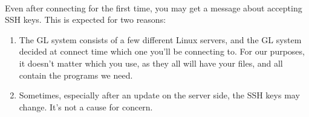\documentclass[letter,11pt]{article}
\begin{document}
\paragraph{}Even after connecting for the first time, you may get a message about accepting SSH keys. This is expected for two reasons:

\begin{enumerate}
    \item The GL system consists of a few different Linux servers, and the GL system decided at connect time which one you'll be connecting to. For our purposes, it doesn't matter which you use, as they all will have your files, and all contain the programs we need.
    \item Sometimes, especially after an update on the server side, the SSH keys may change. It's not a cause for concern.
\end{enumerate}
\end{document}
